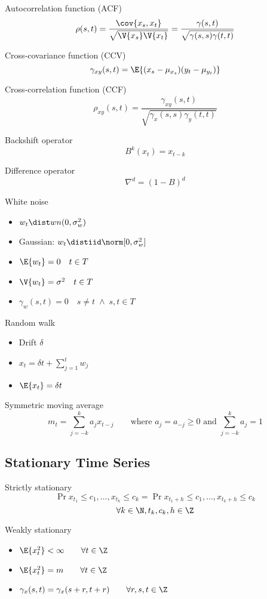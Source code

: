 \documentclass[landscape]{article}
\begin{document}
\begin{multicols*}{2}
Autocorrelation function (ACF)
\[\rho(s,t) = \frac{\cov{x_s,x_t}}{\sqrt{\V{x_s}\V{x_t}}}
            = \frac{\gamma(s,t)}{\sqrt{\gamma(s,s)\gamma(t,t)}}\]

Cross-covariance function (CCV)
\[\gamma_{xy}(s,t) = \E{(x_s-\mu_{x_s})(y_t-\mu_{y_t})}\]

Cross-correlation function (CCF)
\[\rho_{xy}(s,t) = \frac{\gamma_{xy}(s,t)}{\sqrt{\gamma_x(s,s)\gamma_y(t,t)}}\]

Backshift operator
\[B^k(x_t) = x_{t-k}\]

Difference operator
\[\nabla^d = (1-B)^d\]

White noise
\begin{itemize}
  \item $w_t \dist wn(0, \sigma_w^2)$
  \item Gaussian: $w_t \distiid \norm[0, \sigma_w^2]$
  \item $\E{w_t} = 0 \quad t\in T$
  \item $\V{w_t} = \sigma^2 \quad t\in T$
  \item $\gamma_w(s,t) = 0 \quad s \neq t \;\wedge\; s,t\in T$
\end{itemize}


Random walk
\begin{itemize}
  \item Drift $\delta$
  \item $x_t = \delta t + \sum_{j=1}^t w_j$
  \item $\E{x_t} = \delta t$
\end{itemize}

Symmetric moving average
\[m_t = \sum_{j=-k}^k a_j x_{t-j}
\qquad \text{where } a_j=a_{-j}\ge0 \text{ and } \sum_{j=-k}^k a_j = 1\]

\subsection{Stationary Time Series}

Strictly stationary
\[\Pr{x_{t_1} \le c_1, \dots, x_{t_k} \le c_k} =
  \Pr{x_{t_1+h} \le c_1, \dots, x_{t_k+h} \le c_k}\]
\[\forall k\in\N,t_k, c_k, h\in\Z\]

Weakly stationary
\begin{itemize}
  \item $\E{x_t^2} < \infty \qquad\forall t\in\Z$
  \item $\E{x_t^2} = m \qquad\forall t\in\Z$
  \item $\gamma_x(s,t) = \gamma_x(s+r, t+r) \qquad\forall r,s,t\in\Z$
\end{itemize}


\end{multicols*}
\end{document}
